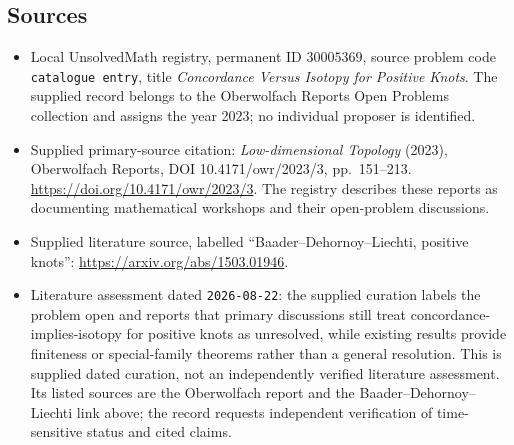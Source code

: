 \documentclass[11pt]{article}
\begin{document}
\subsection{Sources}
\begin{itemize}
\item Local UnsolvedMath registry, permanent ID \(30005369\), source problem code \texttt{catalogue entry}, title \emph{Concordance Versus Isotopy for Positive Knots}. The supplied record belongs to the Oberwolfach Reports Open Problems collection and assigns the year 2023; no individual proposer is identified.
\item Supplied primary-source citation: \emph{Low-dimensional Topology} (2023), Oberwolfach Reports, DOI 10.4171/owr/2023/3, pp.\ 151--213. \url{https://doi.org/10.4171/owr/2023/3}. The registry describes these reports as documenting mathematical workshops and their open-problem discussions.
\item Supplied literature source, labelled ``Baader--Dehornoy--Liechti, positive knots'': \url{https://arxiv.org/abs/1503.01946}.
\item Literature assessment dated \texttt{2026-08-22}: the supplied curation labels the problem open and reports that primary discussions still treat concordance-implies-isotopy for positive knots as unresolved, while existing results provide finiteness or special-family theorems rather than a general resolution. This is supplied dated curation, not an independently verified literature assessment. Its listed sources are the Oberwolfach report and the Baader--Dehornoy--Liechti link above; the record requests independent verification of time-sensitive status and cited claims.
\end{itemize}
\end{document}
